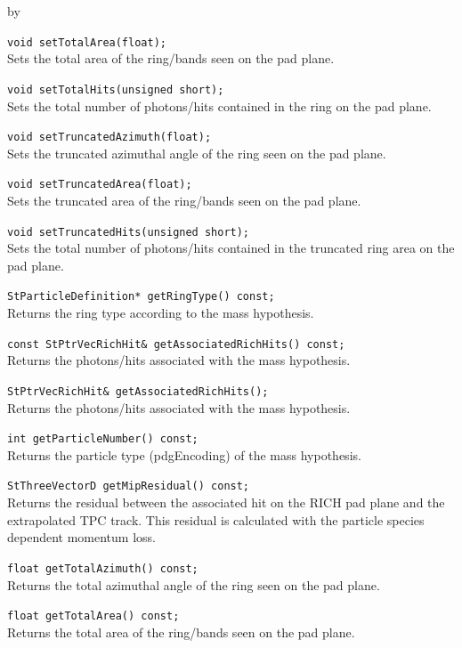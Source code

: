 \documentclass[twoside]{article}
\newcommand{\entrylabel}[1]{\mbox{\textbf{{#1}}}\hfil}%
\newenvironment{entry}
{\begin{list}{}%
    {\renewcommand{\makelabel}{\entrylabel}%
     \setlength{\labelwidth}{90pt}%
     \setlength{\leftmargin}{\labelwidth}
     \advance\leftmargin by \labelsep%
      }%
    }%
  {\end{list}}
\newcommand{\Entrylabel}[1]%
{\raisebox{0pt}[1ex][0pt]{\makebox[\labelwidth][l]%
    {\parbox[t]{\labelwidth}{\hspace{0pt}\textbf{{#1}}}}}}
\newenvironment{Entry}%
{\renewcommand{\entrylabel}{\Entrylabel}\begin{entry}}%
  {\end{entry}}
\begin{document}
\begin{Entry}
    \verb+void setTotalArea(float);+\\
    Sets the total area of the ring/bands
    seen on the pad plane.

    \verb+void setTotalHits(unsigned short);+\\
    Sets the total number of photons/hits
    contained in the ring on the pad plane.
    
    \verb+void setTruncatedAzimuth(float);+\\
    Sets the truncated azimuthal angle of the ring
    seen on the pad plane.

    \verb+void setTruncatedArea(float);+\\
    Sets the truncated area of the ring/bands
    seen on the pad plane.

    \verb+void setTruncatedHits(unsigned short);+\\
    Sets the total number of photons/hits
    contained in the truncated ring area on
    the pad plane.

    \verb+StParticleDefinition* getRingType() const;+\\
    Returns the ring type according to the mass hypothesis.

    \verb+const StPtrVecRichHit& getAssociatedRichHits() const;+\\
    Returns the photons/hits associated with the
    mass hypothesis.
    
    \verb+StPtrVecRichHit& getAssociatedRichHits();+\\
    Returns the photons/hits associated with the
    mass hypothesis.
    
    \verb+int getParticleNumber() const;+\\
    Returns the particle type (pdgEncoding)
    of the mass hypothesis.
    
    \verb+StThreeVectorD getMipResidual() const;+\\
    Returns  the residual between the associated hit on the
    RICH pad plane and the extrapolated TPC track.  This
    residual is calculated with the particle species dependent
    momentum loss.
    
    \verb+float getTotalAzimuth() const;+\\
    Returns the total azimuthal angle of the ring
    seen on the pad plane.
    
    \verb+float getTotalArea() const;+\\
    Returns the total area of the ring/bands
    seen on the pad plane.
    

\end{Entry}
\end{document}
